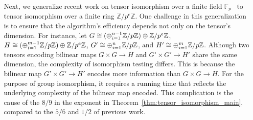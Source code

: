 Next, we generalize recent work on tensor isomorphism over a finite field $\mathbb{F}_p$~\cite{Sun23,IMQSZ24} to tensor isomorphism over a finite ring $\mathbb{Z} / p^e \mathbb{Z}$. One challenge in this generalization is to ensure that the algorithm's efficiency depends not only on the tensor's dimension. For instance, let $G \cong (\oplus_{i = 1}^{n-1} \mathbb{Z}/p\mathbb{Z}) \oplus \mathbb{Z} / p^e\mathbb{Z}$, $H \cong (\oplus_{i = 1}^{m-1} \mathbb{Z} / p \mathbb{Z})\oplus \mathbb{Z}/p^e\mathbb{Z}$, $G' \cong \oplus_{i = 1}^{n} \mathbb{Z}/p\mathbb{Z}$, and $H' \cong \oplus_{i = 1}^{m} \mathbb{Z}/p\mathbb{Z}$. Although two tensors encoding bilinear maps $G \times G \rightarrow H$ and $G' \times G' \rightarrow H'$  share the same dimension, the complexity of isomorphism testing differs. This is because the bilinear map $G' \times G' \rightarrow H'$ encodes more information than $G \times G \rightarrow H$.
For the purpose of group isomorphism, it requires a running time that reflects the underlying complexity of the bilinear map encoded. This complication is the cause of the $8/9$ in the exponent in Theorem~\ref{thm:tensor_isomorphism_main}, compared to the $5/6$ \cite{Sun23} and $1/2$ \cite{IMQSZ24} of previous work.




